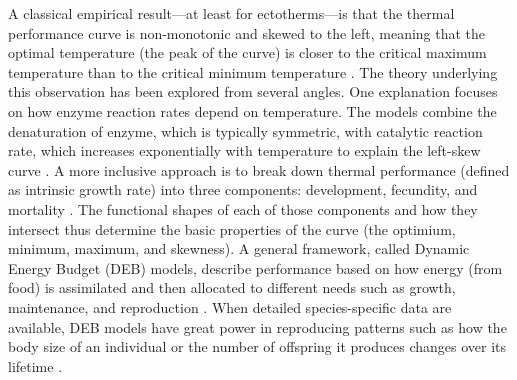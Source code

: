 A classical empirical result---at least for ectotherms---is that the thermal performance curve is non-monotonic and skewed to the left, meaning that the optimal temperature (the peak of the curve) is closer to the critical maximum temperature than to the critical minimum temperature \citep{Barlow1962,Huey2001,Angilletta2009}.
The theory underlying this observation has been explored from several angles.
One explanation focuses on how enzyme reaction rates depend on temperature.
The models combine the denaturation of enzyme, which is typically symmetric, with catalytic reaction rate, which increases exponentially with temperature to explain the left-skew curve \citep{VandH1996, VandH2002, Ratkowsky2005, Kingsolver2009}.
A more inclusive approach is to break down thermal performance (defined as intrinsic growth rate) into three components: development, fecundity, and mortality \citep{Amarasekare2012}.
The functional shapes of each of those components and how they intersect thus determine the basic properties of the curve (the optimium, minimum, maximum, and skewness).
A general framework, called Dynamic Energy Budget (DEB) models, describe performance based on how energy (from food) is assimilated and then allocated to different needs such as growth, maintenance, and reproduction \citep{Kooijman2009}.
When detailed species-specific data are available, DEB models have great power in reproducing patterns such as how the body size of an individual or the number of offspring it produces changes over its lifetime \citep{Nisbet2000}.

